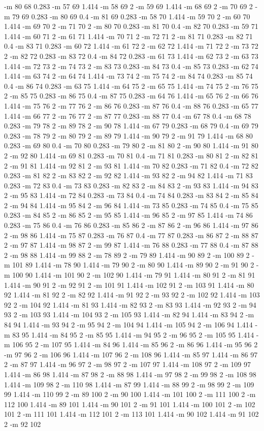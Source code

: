 \documentclass[12pt]{article}
\begin{document}
-m 80 68 0.283 -m 57 69 1.414 -m 58 69 2 -m 59 69 1.414 -m 68 69 2 -m 70 69 2 -m 79 69 0.283 -m 80 69 0.4 -m 81 69 0.283 -m 58 70 1.414 -m 59 70 2 -m 60 70 1.414 -m 69 70 2 -m 71 70 2 -m 80 70 0.283 -m 81 70 0.4 -m 82 70 0.283 -m 59 71 1.414 -m 60 71 2 -m 61 71 1.414 -m 70 71 2 -m 72 71 2 -m 81 71 0.283 -m 82 71 0.4 -m 83 71 0.283 -m 60 72 1.414 -m 61 72 2 -m 62 72 1.414 -m 71 72 2 -m 73 72 2 -m 82 72 0.283 -m 83 72 0.4 -m 84 72 0.283 -m 61 73 1.414 -m 62 73 2 -m 63 73 1.414 -m 72 73 2 -m 74 73 2 -m 83 73 0.283 -m 84 73 0.4 -m 85 73 0.283 -m 62 74 1.414 -m 63 74 2 -m 64 74 1.414 -m 73 74 2 -m 75 74 2 -m 84 74 0.283 -m 85 74 0.4 -m 86 74 0.283 -m 63 75 1.414 -m 64 75 2 -m 65 75 1.414 -m 74 75 2 -m 76 75 2 -m 85 75 0.283 -m 86 75 0.4 -m 87 75 0.283 -m 64 76 1.414 -m 65 76 2 -m 66 76 1.414 -m 75 76 2 -m 77 76 2 -m 86 76 0.283 -m 87 76 0.4 -m 88 76 0.283 -m 65 77 1.414 -m 66 77 2 -m 76 77 2 -m 87 77 0.283 -m 88 77 0.4 -m 67 78 0.4 -m 68 78 0.283 -m 79 78 2 -m 89 78 2 -m 90 78 1.414 -m 67 79 0.283 -m 68 79 0.4 -m 69 79 0.283 -m 78 79 2 -m 80 79 2 -m 89 79 1.414 -m 90 79 2 -m 91 79 1.414 -m 68 80 0.283 -m 69 80 0.4 -m 70 80 0.283 -m 79 80 2 -m 81 80 2 -m 90 80 1.414 -m 91 80 2 -m 92 80 1.414 -m 69 81 0.283 -m 70 81 0.4 -m 71 81 0.283 -m 80 81 2 -m 82 81 2 -m 91 81 1.414 -m 92 81 2 -m 93 81 1.414 -m 70 82 0.283 -m 71 82 0.4 -m 72 82 0.283 -m 81 82 2 -m 83 82 2 -m 92 82 1.414 -m 93 82 2 -m 94 82 1.414 -m 71 83 0.283 -m 72 83 0.4 -m 73 83 0.283 -m 82 83 2 -m 84 83 2 -m 93 83 1.414 -m 94 83 2 -m 95 83 1.414 -m 72 84 0.283 -m 73 84 0.4 -m 74 84 0.283 -m 83 84 2 -m 85 84 2 -m 94 84 1.414 -m 95 84 2 -m 96 84 1.414 -m 73 85 0.283 -m 74 85 0.4 -m 75 85 0.283 -m 84 85 2 -m 86 85 2 -m 95 85 1.414 -m 96 85 2 -m 97 85 1.414 -m 74 86 0.283 -m 75 86 0.4 -m 76 86 0.283 -m 85 86 2 -m 87 86 2 -m 96 86 1.414 -m 97 86 2 -m 98 86 1.414 -m 75 87 0.283 -m 76 87 0.4 -m 77 87 0.283 -m 86 87 2 -m 88 87 2 -m 97 87 1.414 -m 98 87 2 -m 99 87 1.414 -m 76 88 0.283 -m 77 88 0.4 -m 87 88 2 -m 98 88 1.414 -m 99 88 2 -m 78 89 2 -m 79 89 1.414 -m 90 89 2 -m 100 89 2 -m 101 89 1.414 -m 78 90 1.414 -m 79 90 2 -m 80 90 1.414 -m 89 90 2 -m 91 90 2 -m 100 90 1.414 -m 101 90 2 -m 102 90 1.414 -m 79 91 1.414 -m 80 91 2 -m 81 91 1.414 -m 90 91 2 -m 92 91 2 -m 101 91 1.414 -m 102 91 2 -m 103 91 1.414 -m 80 92 1.414 -m 81 92 2 -m 82 92 1.414 -m 91 92 2 -m 93 92 2 -m 102 92 1.414 -m 103 92 2 -m 104 92 1.414 -m 81 93 1.414 -m 82 93 2 -m 83 93 1.414 -m 92 93 2 -m 94 93 2 -m 103 93 1.414 -m 104 93 2 -m 105 93 1.414 -m 82 94 1.414 -m 83 94 2 -m 84 94 1.414 -m 93 94 2 -m 95 94 2 -m 104 94 1.414 -m 105 94 2 -m 106 94 1.414 -m 83 95 1.414 -m 84 95 2 -m 85 95 1.414 -m 94 95 2 -m 96 95 2 -m 105 95 1.414 -m 106 95 2 -m 107 95 1.414 -m 84 96 1.414 -m 85 96 2 -m 86 96 1.414 -m 95 96 2 -m 97 96 2 -m 106 96 1.414 -m 107 96 2 -m 108 96 1.414 -m 85 97 1.414 -m 86 97 2 -m 87 97 1.414 -m 96 97 2 -m 98 97 2 -m 107 97 1.414 -m 108 97 2 -m 109 97 1.414 -m 86 98 1.414 -m 87 98 2 -m 88 98 1.414 -m 97 98 2 -m 99 98 2 -m 108 98 1.414 -m 109 98 2 -m 110 98 1.414 -m 87 99 1.414 -m 88 99 2 -m 98 99 2 -m 109 99 1.414 -m 110 99 2 -m 89 100 2 -m 90 100 1.414 -m 101 100 2 -m 111 100 2 -m 112 100 1.414 -m 89 101 1.414 -m 90 101 2 -m 91 101 1.414 -m 100 101 2 -m 102 101 2 -m 111 101 1.414 -m 112 101 2 -m 113 101 1.414 -m 90 102 1.414 -m 91 102 2 -m 92 102 
\end{document}
